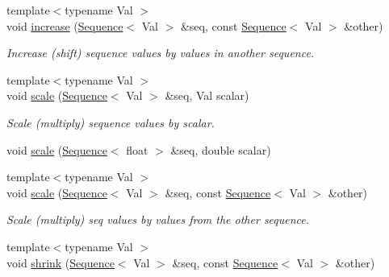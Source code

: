 \begin{DoxyCompactItemize}
\item 
{\footnotesize template$<$typename Val $>$ }\\void \hyperlink{namespace_wire_cell_1_1_waveform_a5f2540f66c9584343f87cbe624c76943}{increase} (\hyperlink{namespace_wire_cell_1_1_waveform_a1d2a1b672e3b220dcd64a994531de95d}{Sequence}$<$ Val $>$ \&seq, const \hyperlink{namespace_wire_cell_1_1_waveform_a1d2a1b672e3b220dcd64a994531de95d}{Sequence}$<$ Val $>$ \&other)
\begin{DoxyCompactList}\small\item\em Increase (shift) sequence values by values in another sequence. \end{DoxyCompactList}\item 
{\footnotesize template$<$typename Val $>$ }\\void \hyperlink{namespace_wire_cell_1_1_waveform_aa8d25ae88346929b5e54cd116f7a4f47}{scale} (\hyperlink{namespace_wire_cell_1_1_waveform_a1d2a1b672e3b220dcd64a994531de95d}{Sequence}$<$ Val $>$ \&seq, Val scalar)
\begin{DoxyCompactList}\small\item\em Scale (multiply) sequence values by scalar. \end{DoxyCompactList}\item 
void \hyperlink{namespace_wire_cell_1_1_waveform_a3278b47bbecdbb8a663286d9cdec0d75}{scale} (\hyperlink{namespace_wire_cell_1_1_waveform_a1d2a1b672e3b220dcd64a994531de95d}{Sequence}$<$ float $>$ \&seq, double scalar)
\item 
{\footnotesize template$<$typename Val $>$ }\\void \hyperlink{namespace_wire_cell_1_1_waveform_a6eea0e61cd0999be1219fd0d504e3b13}{scale} (\hyperlink{namespace_wire_cell_1_1_waveform_a1d2a1b672e3b220dcd64a994531de95d}{Sequence}$<$ Val $>$ \&seq, const \hyperlink{namespace_wire_cell_1_1_waveform_a1d2a1b672e3b220dcd64a994531de95d}{Sequence}$<$ Val $>$ \&other)
\begin{DoxyCompactList}\small\item\em Scale (multiply) seq values by values from the other sequence. \end{DoxyCompactList}\item 
{\footnotesize template$<$typename Val $>$ }\\void \hyperlink{namespace_wire_cell_1_1_waveform_adad443bd3c3ee1a0c2e65c9a39282a53}{shrink} (\hyperlink{namespace_wire_cell_1_1_waveform_a1d2a1b672e3b220dcd64a994531de95d}{Sequence}$<$ Val $>$ \&seq, const \hyperlink{namespace_wire_cell_1_1_waveform_a1d2a1b672e3b220dcd64a994531de95d}{Sequence}$<$ Val $>$ \&other)

\end{DoxyCompactItemize}
